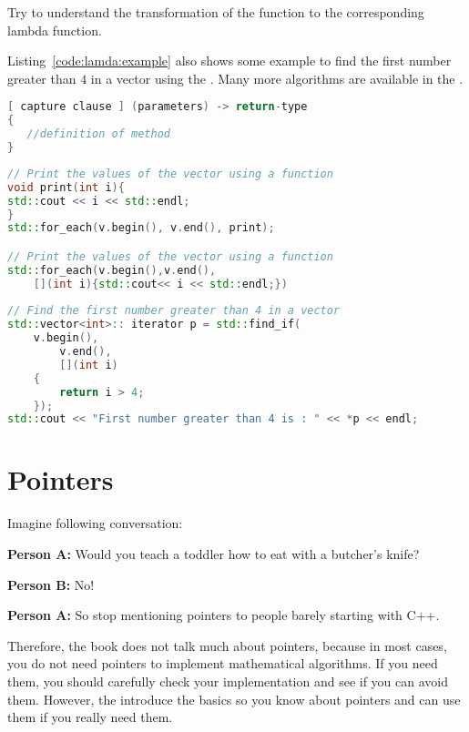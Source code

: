 \begin{exercise}
Try to understand the transformation of the function  to the corresponding lambda function.
\end{exercise}

Listing~\ref{code:lamda:example} also shows some example to find the first number greater than $4$ in a vector using the . Many more algorithms are available in the .

\begin{lstlisting}[language=c++,caption={Example for lambda functions.
\label{code:lamda:definition}},float,floatplacement=tb]
[ capture clause ] (parameters) -> return-type  
{   
   //definition of method   
} 
\end{lstlisting}


\begin{lstlisting}[language=c++,caption={Practical example for a lambda function.
\label{code:lamda:example}},float,floatplacement=tb]
// Print the values of the vector using a function
void print(int i){
std::cout << i << std::endl;
}
std::for_each(v.begin(), v.end(), print); 

// Print the values of the vector using a function
std::for_each(v.begin(),v.end(),
	[](int i){std::cout<< i << std::endl;})
	
// Find the first number greater than 4 in a vector
std::vector<int>:: iterator p = std::find_if(
    v.begin(), 
    	v.end(), 
    	[](int i) 
    { 
        return i > 4; 
    }); 
std::cout << "First number greater than 4 is : " << *p << endl;
\end{lstlisting}

\section{Pointers}
Imagine following conversation:
\begin{flushleft}
\textbf{Person A:} Would you teach a toddler how to eat with a butcher's knife?
\end{flushleft}
\begin{flushright}
\textbf{Person B:} No!
\end{flushright}
\begin{flushleft}
\textbf{Person A:} So stop mentioning pointers to people barely
starting with C++.
\end{flushleft}
Therefore, the book does not talk much about pointers, because in most cases, you do not need pointers to implement mathematical algorithms. If you need them, you should carefully check your implementation and see if you can avoid them. However, the introduce the basics so you know about pointers and can use them if you really need them.\\

